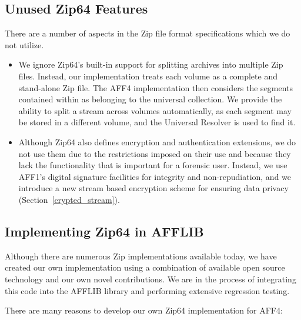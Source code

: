 \documentclass[10pt, conference]{IEEEtran}
\begin{document}
\subsection{Unused Zip64 Features}
There are a number of aspects in the Zip file format specifications
which we do not utilize.
\begin{itemize}
\item We ignore Zip64's built-in support for splitting
archives into multiple Zip files. Instead, our implementation treats
each volume as a complete and stand-alone Zip file. The AFF4
implementation then considers the segments contained within as
belonging to the universal collection. We provide the ability to split
a stream across volumes automatically, as each segment may be stored
in a different volume, and the Universal Resolver is used to find it.

\item Although Zip64 also defines encryption and authentication
extensions, we do not use them due to the restrictions imposed on
their use and because they lack the functionality that is important
for a forensic user. Instead, we use AFF1's digital signature
facilities for integrity and non-repudiation, and we introduce a new
stream based encryption scheme for ensuring data privacy
(Section~\ref{crypted_stream}).

\end{itemize}

\subsection{Implementing Zip64 in AFFLIB}
Although there are numerous Zip implementations available
today, we have created our own implementation using a combination of
available open source technology and our own novel contributions. We
are in the process of integrating this code into the AFFLIB library
and performing extensive regression testing. 

There are many reasons to develop our own Zip64 implementation for
AFF4:
\end{document}
